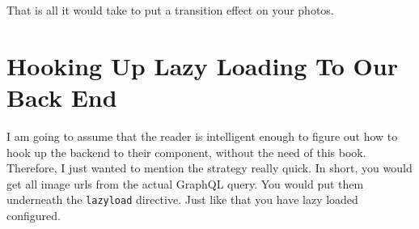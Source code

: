 That is all it would take to put a transition effect on your photos.

\section{ Hooking Up Lazy Loading To Our Back End }
I am going to assume that the reader is intelligent enough to figure out how to
hook up the backend to their component, without the need of this book. Therefore, 
I just wanted to mention the strategy really quick. In short, you would get all 
image urls from the actual GraphQL query. You would put them underneath the 
\lstinline{lazyload} directive. Just like that you have lazy loaded configured. 


